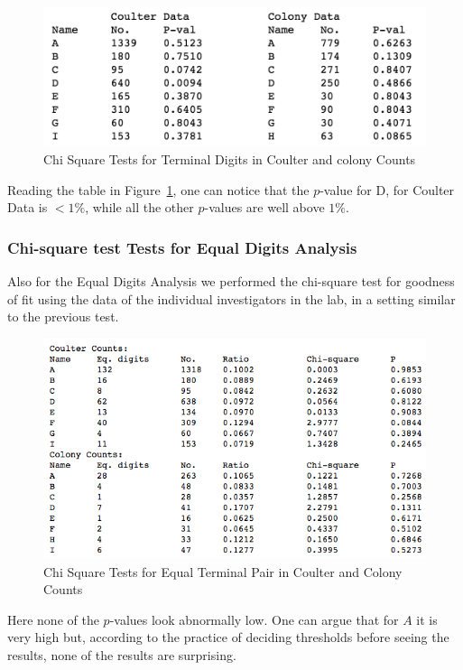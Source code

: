 \documentclass{article}
\begin{document}
\begin{figure}[H]
\label{fig:chi-sum}
\centering
\includegraphics[width=0.7\linewidth]{images/raaz_term_chi_summary.png}
\caption{Chi Square Tests for Terminal Digits in Coulter and colony
Counts}
\end{figure}

Reading the table in Figure~\ref{fig:chi-sum}, one can notice that the $p$-value for D, for Coulter Data is $<1\%$, while all the other $p$-values are well above $1\%$.

    \subsubsection{Chi-square test Tests for Equal Digits
Analysis}\label{chi-square-test-tests-for-equal-digits-analysis}

Also for the Equal Digits Analysis we performed the chi-square test for
goodness of fit using the data of the individual investigators in the
lab, in a setting similar to the previous test.
\begin{figure}[H]
\centering
\includegraphics[width=0.9\linewidth]{images/raaz_eq_chi_elaborate.png}
\caption{Chi Square Tests for Equal Terminal Pair in Coulter and Colony
Counts}
\end{figure}

Here none of the $p$-values look abnormally low. One can argue that for $A$ it is very high but, according to the practice of deciding thresholds before seeing the results, none of the results are surprising.
\end{document}
